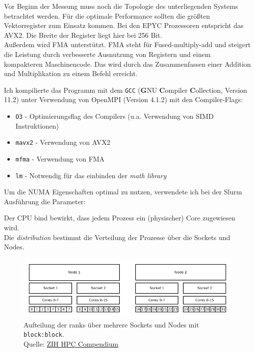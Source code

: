 \documentclass[german,plainarticle,hyperref,utf8]{zihpub}
\begin{document}
	Vor Beginn der Messung muss noch die Topologie des unterliegenden Systems betrachtet werden. Für die optimale Performance sollten die größten Vektorregister zum Einsatz kommen. Bei den EPYC Prozessoren entspricht das AVX2. Die Breite der Register liegt hier bei 256 Bit.\\
	Außerdem wird FMA unterstützt. FMA steht für Fused-multiply-add und steigert die Leistung durch verbesserte Ausnutzung von Registern und einem kompakteren Maschinencode. Das wird durch das Zusammenfassen einer Addition und Multiplikation zu einem Befehl erreicht.
	
	Ich kompilierte das Programm mit dem \texttt{GCC} (\textbf{G}NU \textbf{C}ompiler \textbf{C}ollection, Version 11.2) unter Verwendung von OpenMPI (Version 4.1.2) mit den Compiler-Flags:
	\begin{itemize}
		\item \texttt{O3} - Optimierungsflag des Compilers (u.a. Verwendung von SIMD Instruktionen)
		\item \texttt{mavx2} - Verwendung von AVX2
		\item \texttt{mfma} - Verwendung von FMA
		\item \texttt{lm} - Notwendig für das einbinden der \textit{math library}
	\end{itemize}
	Um die NUMA Eigenschaften optimal zu nutzen, verwendete ich bei der Slurm Ausführung die Parameter:
	Der CPU bind bewirkt, dass jedem Prozess ein (physischer) Core zugewiesen wird.\\
	
	Die \textit{distribution} bestimmt die Verteilung der Prozesse über die Sockets und Nodes.
	\newcommand*{\captionsource}[2]{%
		\caption[{#1}]{%
			#1%
			\\\hspace{\linewidth}%
			Quelle: #2%
		}%
	}
	\begin{figure}[h]
		\centering
		\includegraphics[scale=0.5]{mpi_block_block.png}
		\captionsource{Aufteilung der ranks über mehrere Sockets und Nodes mit \texttt{block:block}.}{\href{https://hpc-wiki.zih.tu-dresden.de/jobs\_and\_resources/binding\_and\_distribution\_of\_tasks/}{ZIH HPC Compendium}}
	\end{figure}
\end{document}
